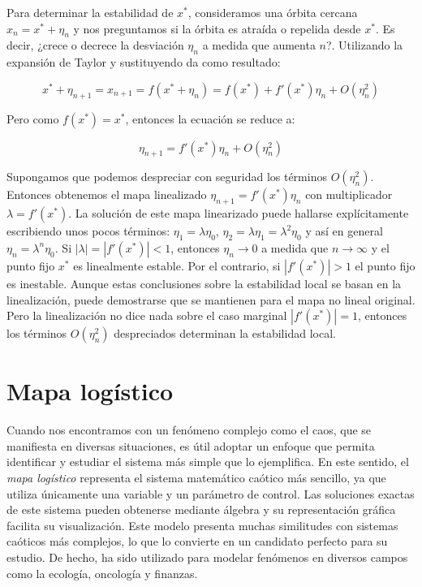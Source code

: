        Para determinar la estabilidad de $x^{*}$, consideramos una órbita cercana $x_{n} = x^{*} + \eta_{n} $ y nos preguntamos si la órbita es atraída o repelida desde $x^{*}$. Es decir, ¿crece o decrece la desviación $\eta_{n}$ a medida que aumenta $n$?. Utilizando la expansión de Taylor y sustituyendo da como resultado:

        \begin{equation}
            x^{*} + \eta_{n+1} = x_{n+1} = f(x^{*} + \eta_{n}) = f(x^{*}) + f'(x^{*}) \eta_{n} + O(\eta_{n}^{2})
        \end{equation}

        Pero como $f(x^{*}) = x^{*} $, entonces la ecuación se reduce a:

        \begin{equation}
            \eta_{n+1} = f'(x^{*}) \eta_{n} + O(\eta_{n}^{2})
        \end{equation}

        Supongamos que podemos despreciar con seguridad los términos $O(\eta_{n}^{2} )$. Entonces obtenemos el mapa linealizado $ \eta_{n+1} = f'(x^{*}) \eta_{n}$ con multiplicador $\lambda = f'(x^{*} )$. La solución de este mapa linearizado puede hallarse explícitamente escribiendo unos pocos términos: $\eta_{1} = \lambda \eta_{0}$, $\eta_{2} = \lambda \eta_{1} = \lambda^{2} \eta_{0} $ y así en general $\eta_{n} = \lambda^{n} \eta_{0} $. Si $|\lambda| = |f'(x^{*})| < 1$, entonces $\eta_{n} \to 0$ a medida que $n \to \infty$ y el punto fijo $x^{*}$ es linealmente estable. Por el contrario, si $|f'(x^{*})| > 1$ el punto fijo es inestable. Aunque estas conclusiones sobre la estabilidad local se basan en la linealización, puede demostrarse que se mantienen para el mapa no lineal original. Pero la linealización no dice nada sobre el caso marginal $|f'(x^{*})| = 1$, entonces los términos $O(\eta_{n}^{2} )$ despreciados determinan la estabilidad local.

    \section{Mapa logístico}

        Cuando nos encontramos con un fenómeno complejo como el caos, que se manifiesta en diversas situaciones, es útil adoptar un enfoque que permita identificar y estudiar el sistema más simple que lo ejemplifica. En este sentido, el \emph{mapa logístico} representa el sistema matemático caótico más sencillo, ya que utiliza únicamente una variable y un parámetro de control. Las soluciones exactas de este sistema pueden obtenerse mediante álgebra y su representación gráfica facilita su visualización. Este modelo presenta muchas similitudes con sistemas caóticos más complejos, lo que lo convierte en un candidato perfecto para su estudio. De hecho, ha sido utilizado para modelar fenómenos en diversos campos como la ecología, oncología y finanzas.\cite{Sprott2003}

